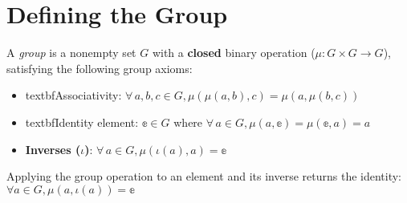 \section{Defining the Group}

\begin{definition}[Group]
    \label{definition : Group}
    \leanok
    A \emph{group} is a nonempty set $G$ with a \textbf{closed} binary operation
    ($\mu : G \times G \rightarrow G$), satisfying the following group axioms:
    \begin{itemize}
        \item textbf{Associativity}: $\forall \,a, b, c \in G, \mu(\mu(a, b), c) =
        \mu(a, \mu(b, c))$
        \item textbf{Identity element}: $\mathbb{e}\in G$ where $\forall\,a \in G,
        \mu (a, \mathbb{e}) = \mu(\mathbb{e}, a) = a$
        \item \textbf{Inverses ($\iota$)}: $\forall\,a \in G, \mu(\iota(a), a) =
        \mathbb{e}$
    \end{itemize}
\end{definition}

\begin{theorem}
    \label{theorem : op_inv}
    \leanok
    Applying the group operation to an element and its inverse returns the
    identity: $\forall a \in G, \mu(a, \iota(a)) = \mathbb{e}$
\end{theorem}
